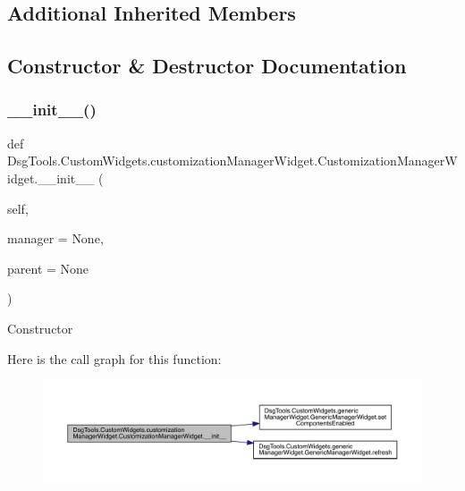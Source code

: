 \subsection*{Additional Inherited Members}


\subsection{Constructor \& Destructor Documentation}
\mbox{\label{class_dsg_tools_1_1_custom_widgets_1_1customization_manager_widget_1_1_customization_manager_widget_a0973cd5c6f6b4f5ce9f0be7c95856bea}} 
\subsubsection{\texorpdfstring{\+\_\+\+\_\+init\+\_\+\+\_\+()}{\_\_init\_\_()}}
{\footnotesize\ttfamily def Dsg\+Tools.\+Custom\+Widgets.\+customization\+Manager\+Widget.\+Customization\+Manager\+Widget.\+\_\+\+\_\+init\+\_\+\+\_\+ (\begin{DoxyParamCaption}\item[{}]{self,  }\item[{}]{manager = {\ttfamily None},  }\item[{}]{parent = {\ttfamily None} }\end{DoxyParamCaption})}

\begin{DoxyVerb}Constructor
\end{DoxyVerb}
 Here is the call graph for this function\+:
\nopagebreak
\begin{figure}[H]
\begin{center}
\leavevmode
\includegraphics[width=350pt]{class_dsg_tools_1_1_custom_widgets_1_1customization_manager_widget_1_1_customization_manager_widget_a0973cd5c6f6b4f5ce9f0be7c95856bea_cgraph}
\end{center}
\end{figure}


